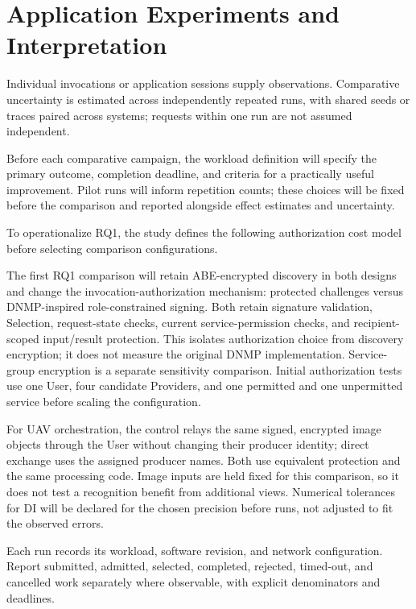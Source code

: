 \section{Application Experiments and Interpretation}
Individual invocations or application sessions supply observations. Comparative uncertainty is estimated across independently repeated runs, with shared seeds or traces paired across systems; requests within one run are not assumed independent.

\begin{samepage}
Before each comparative campaign, the workload definition will specify the primary outcome, completion deadline, and criteria for a practically useful improvement. Pilot runs will inform repetition counts; these choices will be fixed before the comparison and reported alongside effect estimates and uncertainty.
\end{samepage}

To operationalize RQ1, the study defines the following authorization cost model before selecting comparison configurations.

The first RQ1 comparison will retain ABE-encrypted discovery in both designs and change the invocation-authorization mechanism: protected challenges versus DNMP-inspired role-constrained signing. Both retain signature validation, Selection, request-state checks, current service-permission checks, and recipient-scoped input/result protection. This isolates authorization choice from discovery encryption; it does not measure the original DNMP implementation. Service-group encryption is a separate sensitivity comparison. Initial authorization tests use one User, four candidate Providers, and one permitted and one unpermitted service before scaling the configuration.



For UAV orchestration, the control relays the same signed, encrypted image objects through the User without changing their producer identity; direct exchange uses the assigned producer names. Both use equivalent protection and the same processing code. Image inputs are held fixed for this comparison, so it does not test a recognition benefit from additional views. Numerical tolerances for DI will be declared for the chosen precision before runs, not adjusted to fit the observed errors.

Each run records its workload, software revision, and network configuration. Report submitted, admitted, selected, completed, rejected, timed-out, and cancelled work separately where observable, with explicit denominators and deadlines.

